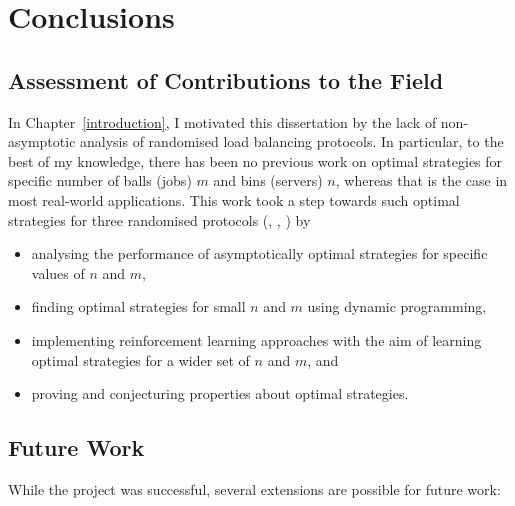 
\chapter{Conclusions}\label{conclusion}

\ifpdf
    \graphicspath{{Chapter3/Figs/Raster/}{Chapter3/Figs/PDF/}{Chapter3/Figs/}}
\else
    \graphicspath{{Chapter3/Figs/Vector/}{Chapter3/Figs/}}
\fi


\section{Assessment of Contributions to the Field}

In Chapter~\ref{introduction}, I motivated this dissertation by the lack of non-asymptotic analysis of randomised load balancing protocols. In particular, to the best of my knowledge, there has been no previous work on optimal strategies for specific number of balls (jobs) $m$ and bins (servers) $n$, whereas that is the case in most real-world applications. This work took a step towards such optimal strategies for three randomised protocols (\TwoThinning, \KThinning, \GraphicalTwoChoice) by

\begin{itemize}
    \item analysing the performance of asymptotically optimal strategies for specific values of $n$ and $m$,
    \item finding optimal strategies for small $n$ and $m$ using dynamic programming,
    \item implementing reinforcement learning approaches with the aim of learning optimal strategies for a wider set of $n$ and $m$, and
    \item proving and conjecturing properties about optimal strategies.
\end{itemize}



\section{Future Work}

While the project was successful, several extensions are possible for future work:

